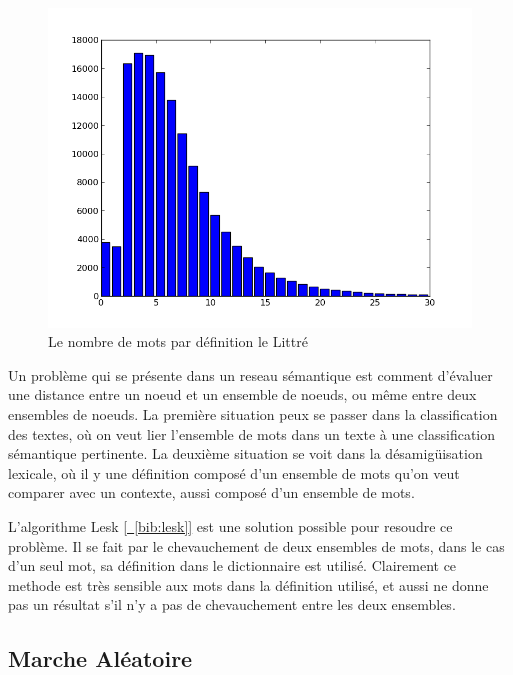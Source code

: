 \begin{figure}
\begin{center}
\includegraphics{Images/words_in_definitions.png}

\caption{Le nombre de mots par définition le Littré}
\label{fig:nmotsperentry}
\end{center}
\end{figure}

Un problème qui se présente dans un reseau sémantique est comment d'évaluer une distance
entre un noeud et un ensemble de noeuds, ou même entre deux ensembles de noeuds. La
première situation peux se passer dans la classification des textes, où on veut lier
l'ensemble de mots dans un texte à une classification sémantique pertinente. La
deuxième situation se voit dans la désamigüisation lexicale, où il y une définition
composé d'un ensemble de mots qu'on veut comparer avec un contexte, aussi composé
d'un ensemble de mots.

L'algorithme Lesk \hyperref[bib:lesk]{[~\ref*{bib:lesk}]} est une solution possible pour
resoudre ce problème. Il se fait par le chevauchement de deux ensembles de mots, dans
le cas d'un seul mot, sa définition dans le dictionnaire est utilisé. Clairement ce
methode est très sensible aux mots dans la définition utilisé, et aussi ne donne
pas un résultat s'il n'y a pas de chevauchement entre les deux ensembles. 

\subsection{ Marche Aléatoire }

